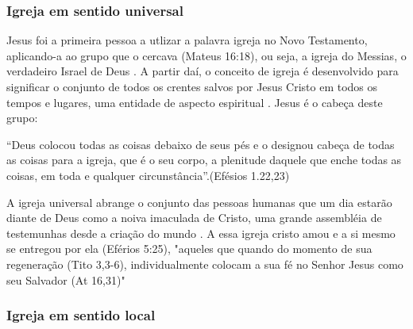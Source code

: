 \documentclass[
	12pt,				%
	openright,			%
	twoside,			%
	a4paper,			%
	english,			%
	french,				%
	spanish,			%
	brazil				%
	]{abntex2}
\begin{document}
\subsubsection{Igreja em sentido universal}

Jesus foi a primeira pessoa a utlizar a palavra igreja no Novo Testamento, aplicando-a ao grupo que o cercava (Mateus 16:18), ou seja, a igreja do Messias, o verdadeiro Israel de Deus \cite[911]{berkhof}. A partir daí, o conceito de igreja é desenvolvido para significar o conjunto de todos os crentes salvos por Jesus Cristo em todos os tempos e lugares, uma entidade de aspecto espiritual \cite[318]{zac}. Jesus é o cabeça deste grupo:
\begin{citacao}“Deus colocou todas as coisas debaixo de seus pés e o designou cabeça de todas as coisas para a igreja, que é o seu corpo, a plenitude daquele que enche todas as coisas, em toda e qualquer circunstância”.(Efésios 1.22,23)
\end{citacao}

A igreja universal abrange o conjunto das pessoas humanas que um dia estarão diante de Deus como a noiva imaculada de Cristo, uma grande assembléia de testemunhas desde a criação do mundo \cite[607]{bavinck}. A essa igreja cristo amou e a si mesmo se entregou por ela (Eférios 5:25), "aqueles que quando do momento de sua regeneração (Tito 3,3-6), individualmente colocam a sua fé no Senhor Jesus como seu Salvador (At 16,31)" \cite[319]{zac}

\subsubsection{Igreja em sentido local}
\end{document}

